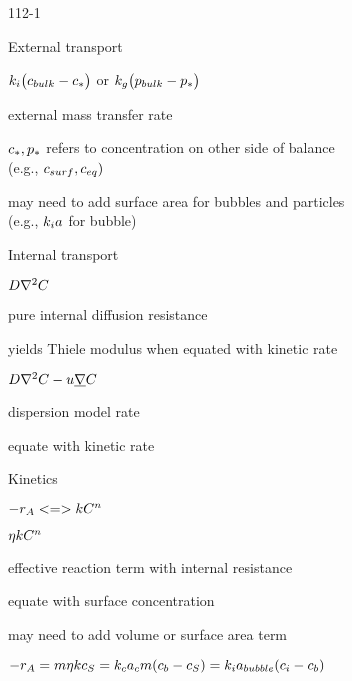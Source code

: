 \begin{mitframe}{112-1}
\begin{listone}
	\item External transport
    \begin{listtwo}
    	\item $\thermcond_{\state}\big(\lightspeed_{bulk}-\lightspeed_*\big)$ or $\thermcond_{\grav}\big(p_{bulk}-p_*\big)$
\begin{listthree}
        	\item external mass transfer rate
            \item $\lightspeed_*,p_*$ refers to concentration on other side of balance \\
            (e.g., $\lightspeed_{surf}, \lightspeed_{eq})$
            \item may need to add surface area for bubbles and particles \\ (e.g., $\thermcond_{\state}\activity$ for bubble)
        \end{listthree}
    \end{listtwo}
	\item Internal transport
    	\begin{listtwo}
        	\item $\elecdisplace\nabla^2\conc$
            \begin{listthree}
            	\item pure internal diffusion resistance
                \item yields Thiele modulus when equated with kinetic rate
            \end{listthree}
        \item $\elecdisplace\nabla^2\conc-\forcepot\gradop\conc$
        	\begin{listthree}
            	\item dispersion model rate
                \item equate with kinetic rate
            \end{listthree}
        \end{listtwo}
\item Kinetics
	\begin{listtwo}
    	\item $-\pos_{\helmholtz}<=>\thermcond\conc^n$
        \item $\intrinsvisc\thermcond\conc^n$
        \begin{listthree}
        	\item effective reaction term with internal resistance
            \item equate with surface concentration
            \item may need to add volume or surface area term
         \end{listthree}
    \end{listtwo}
\item $-\pos_{\helmholtz}=\mass\intrinsvisc\thermcond\lightspeed_{\entropy}=\thermcond_{\lightspeed}\activity_{\lightspeed}\mass(\lightspeed_b-\lightspeed_{\entropy})=\thermcond_{\state}\activity_{bubble}(\lightspeed_{\state}-\lightspeed_b)$
\end{listone}    
\end{mitframe}